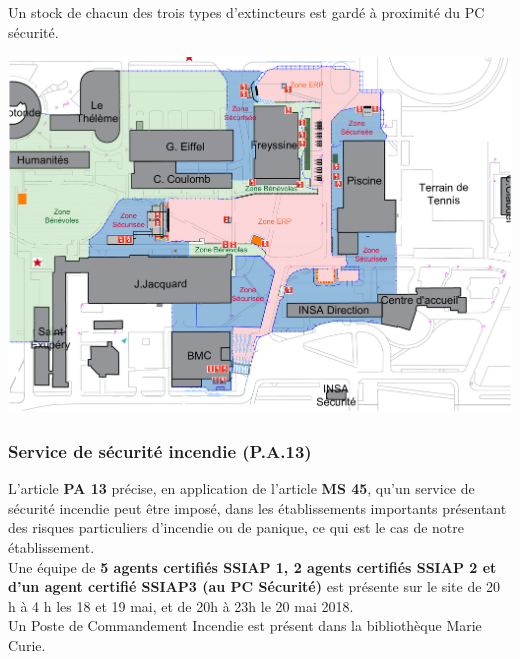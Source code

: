 \documentclass[hidelinks, paper=a4, fontsize=13pt]{report}
\begin{document}
Un stock de chacun des trois types d’extincteurs est gardé à proximité du PC sécurité. 

\begin{center}
	\includegraphics[width=.8\textwidth,keepaspectratio]{Exports/Plan_24h_44eme-Extincteurs}
\end{center}


\subsubsection{Service de sécurité incendie (P.A.13)}
\label{SecuIncendie}

L’article \textbf{PA 13} précise, en application de l’article \textbf{MS 45}, qu’un service de sécurité incendie peut être imposé, dans les établissements importants présentant des risques particuliers d'incendie ou de panique, ce qui est le cas de notre établissement. \\

Une équipe de \textbf{5 agents certifiés SSIAP 1, 2 agents certifiés SSIAP 2 et d’un agent certifié SSIAP3 (au PC Sécurité)} est présente sur le site de 20 h à 4 h les 18 et 19  mai, et de 20h à 23h le 20 mai 2018. \\
Un Poste de Commandement Incendie est présent dans la bibliothèque Marie Curie. \\
\end{document}
